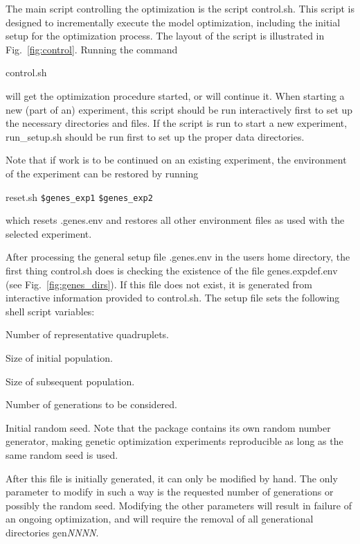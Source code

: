\documentclass[12pt]{article}
\newcommand{\file}{\sf}
\newcommand{\code}{\tt}
\newenvironment{plist}{\begin{list}{nofile ?}{\parsep 0mm
            \itemsep 0mm \leftmargin 35mm \labelwidth 25mm
            \rightmargin 10mm}}{\end{list}}
\newcommand{\pit}[2]{\item[{\code{#1}}\hfill]{#2}}
\begin{document}
The main script controlling the optimization is the script {\file control.sh}.
This script is designed to incrementally execute the model optimization,
including the initial setup for the optimization process. The layout of the
script is illustrated in Fig.~\ref{fig:control}. Running the command
\begin{center}
{\file control.sh}
\end{center}
\noindent
will get the optimization procedure started, or will continue it. When
starting a new (part of an) experiment, this script should be run
interactively first to set up the necessary directories and files. If the
script is run to start a new experiment, {\file run\_setup.sh} should be run
first to set up the proper data directories.

Note that if work is to be continued on an existing experiment, the
environment of the experiment can be restored by running
\begin{center}
{\file reset.sh} {\code \$genes\_exp1} {\code \$genes\_exp2}
\end{center}
\noindent
which resets {\file .genes.env} and restores all other environment files as
used with the selected experiment.

After processing the general setup file {\file .genes.env} in the users home
directory, the first thing {\file control.sh} does is checking the existence
of the file {\file genes.expdef.env} (see Fig.~\ref{fig:genes_dirs}). If this
file does not exist, it is generated from interactive information provided to
{\file control.sh}. The setup file sets the following shell script variables:

\begin{plist}
\pit{\$genes\_nq   }{Number of representative quadruplets.}
\pit{\$genes\_npop0}{Size of initial population.}
\pit{\$genes\_npop }{Size of subsequent population.}
\pit{\$genes\_ngen }{Number of generations to be considered.}
\pit{\$genes\_seed }{Initial random seed. Note that the package contains its
                     own random number generator, making genetic optimization
		     experiments reproducible as long as the same random seed
		     is used.}
\end{plist}

\noindent
After this file is initially generated, it can only be modified by hand. The
only parameter to modify in such a way is the requested number of generations
or possibly the random seed. Modifying the other parameters will result in
failure of an ongoing optimization, and will require the removal of all
generational directories {\file gen{\it NNNN}}.
\end{document}
